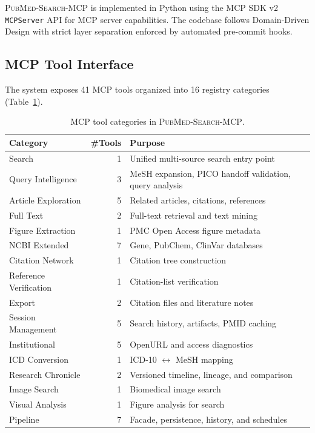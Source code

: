 \documentclass[11pt,a4paper]{article}
\newcommand{\system}{\textsc{PubMed-Search-MCP}}
\begin{document}
\system{} is implemented in Python using the MCP SDK v2 \texttt{MCPServer} API for MCP server capabilities.
The codebase follows Domain-Driven Design with strict layer separation enforced by automated pre-commit hooks.

\subsection{MCP Tool Interface}

The system exposes 41 MCP tools organized into 16 registry categories (Table~\ref{tab:tools}).

\begin{table}[htbp]
\centering
\caption{MCP tool categories in \system{}.}
\label{tab:tools}
\begin{tabular}{lrl}
\toprule
\textbf{Category} & \textbf{\#Tools} & \textbf{Purpose} \\
\midrule
Search             & 1  & Unified multi-source search entry point \\
Query Intelligence & 3  & MeSH expansion, PICO handoff validation, query analysis \\
Article Exploration & 5 & Related articles, citations, references \\
Full Text          & 2  & Full-text retrieval and text mining \\
Figure Extraction  & 1  & PMC Open Access figure metadata \\
NCBI Extended      & 7  & Gene, PubChem, ClinVar databases \\
Citation Network   & 1  & Citation tree construction \\
Reference Verification & 1 & Citation-list verification \\
Export             & 2  & Citation files and literature notes \\
Session Management & 5  & Search history, artifacts, PMID caching \\
Institutional      & 5  & OpenURL and access diagnostics \\
ICD Conversion     & 1  & ICD-10 $\leftrightarrow$ MeSH mapping \\
Research Chronicle & 2  & Versioned timeline, lineage, and comparison \\
Image Search       & 1  & Biomedical image search \\
Visual Analysis    & 1  & Figure analysis for search \\
Pipeline           & 7  & Facade, persistence, history, and schedules \\
\bottomrule
\end{tabular}
\end{table}
\end{document}
